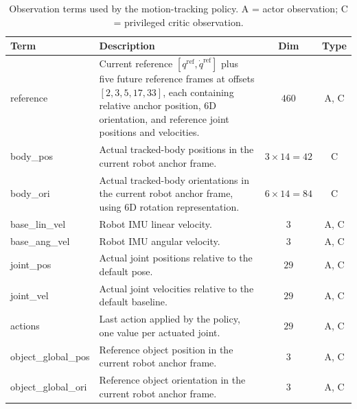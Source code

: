\documentclass{article}
\begin{document}
\begin{table}[t]
\centering
\caption{Observation terms used by the motion-tracking policy. A = actor observation; C = privileged critic observation.}
\label{tab:Obs Motion Tracker}
\small
\begin{tabular}{@{}l p{6.5cm} c c@{}}
\toprule
Term & Description & Dim & Type \\
\midrule
reference & Current reference $[q^{\text{ref}}, \dot{q}^{\text{ref}}]$ plus five future reference frames at offsets $[2,3,5,17,33]$, each containing relative anchor position, 6D orientation, and reference joint positions and velocities. & $460$ & A, C \\[4pt]
body\_pos & Actual tracked-body positions in the current robot anchor frame. & $3{\times}14 = 42$ & C \\[4pt]
body\_ori & Actual tracked-body orientations in the current robot anchor frame, using 6D rotation representation. & $6{\times}14 = 84$ & C \\[4pt]
base\_lin\_vel & Robot IMU linear velocity. & $3$ & A, C \\[4pt]
base\_ang\_vel & Robot IMU angular velocity. & $3$ & A, C \\[4pt]
joint\_pos & Actual joint positions relative to the default pose. & $29$ & A, C \\[4pt]
joint\_vel & Actual joint velocities relative to the default baseline. & $29$ & A, C \\[4pt]
actions & Last action applied by the policy, one value per actuated joint. & $29$ & A, C \\[4pt]
object\_global\_pos & Reference object position in the current robot anchor frame. & $3$ & A, C \\[4pt]
object\_global\_ori & Reference object orientation in the current robot anchor frame. & $3$ & A, C \\[4pt]
\bottomrule
\end{tabular}
\vspace{4pt}
\end{table}
\end{document}
